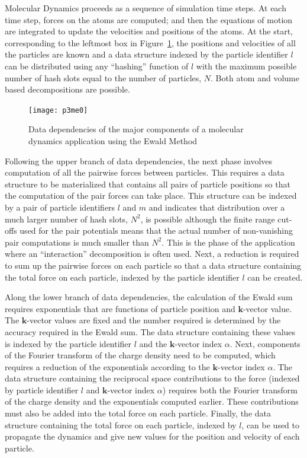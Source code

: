 \documentclass[doublespacing]{elsart}
\begin{document}
Molecular Dynamics proceeds as a sequence of simulation time steps. At
each time step, forces on the atoms are computed; and then the
equations of motion are integrated to update the velocities and
positions of the atoms.  At the start, corresponding to the leftmost
box in Figure~\ref{fig:ewald_data}, the positions and velocities of
all the particles are known and a data structure indexed by the
particle identifier $l$ can be distributed using any ``hashing''
function of $l$ with the maximum possible number of hash slots equal
to the number of particles, $N$.  Both atom and volume based
decompositions are possible.

\begin{figure}
\begin{center}
\texttt{[image: p3me0]}
\caption{Data dependencies of the major components of a molecular
dynamics application using the Ewald Method}
\label{fig:ewald_data}
\end{center}
\end{figure}

Following the upper branch of data dependencies, the next phase
involves computation of all the pairwise forces between particles.
This requires a data structure to be materialized that contains all
pairs of particle positions so that the computation of the pair forces
can take place.  This structure can be indexed by a pair of particle
identifiers $l$ and $m$ and indicates that distribution over a much
larger number of hash slots, $N^2$, is possible although the finite
range cut-offs used for the pair potentials means that the actual
number of non-vanishing pair computations is much smaller than $N^2$.
This is the phase of the application where an ``interaction''
decomposition is often used\cite{plimpton:1995}.  Next, a reduction is
required to sum up the pairwise forces on each particle so that a data
structure containing the total force on each particle, indexed by the
particle identifier $l$ can be created.

Along the lower branch of data dependencies, the calculation of the
Ewald sum requires exponentials that are functions of particle
position and $\mathbf{k}$-vector value.  The $\mathbf{k}$-vector
values are fixed and the number required is determined by the accuracy
required in the Ewald sum.  The data structure containing these values
is indexed by the particle identifier $l$ and the $\mathbf{k}$-vector
index $\alpha$.  Next, components of the Fourier transform of the
charge density need to be computed, which requires a reduction of the
exponentials according to the $\mathbf{k}$-vector index $\alpha$.  The
data structure containing the reciprocal space contributions to the
force (indexed by particle identifier $l$ and $\mathbf{k}$-vector
index $\alpha$) requires both the Fourier transform of the charge
density and the exponentials computed earlier. These contributions
must also be added into the total force on each particle. Finally, the
data structure containing the total force on each particle, indexed by
$l$, can be used to propagate the dynamics
and give new values for the position and velocity of each particle.
\end{document}
